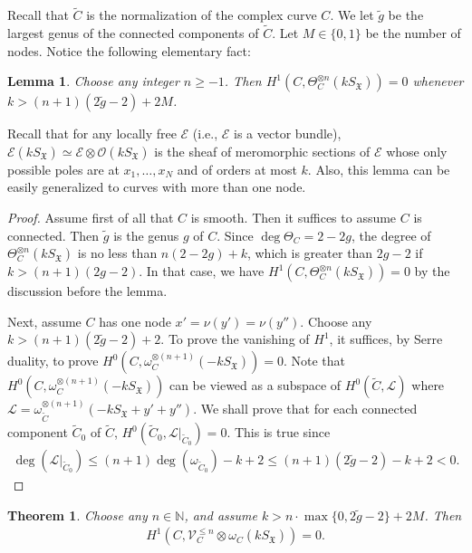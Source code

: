 \documentclass[11pt,b5paper,notitlepage]{article}
\theoremstyle{definition}
\theoremstyle{plain}
\newtheorem{thm}[df]{Theorem}
\newtheorem{lm}[df]{Lemma}
\newcommand{\fk}{\mathfrak}
\newcommand{\wtd}{\widetilde}
\newcommand{\scr}{\mathscr}
\newcommand{\SX}{S_{\fk X}}
\newcommand{\blt}{\bullet}
\newcommand{\Nbb}{\mathbb N}
\numberwithin{equation}{section}
\begin{document}
Recall that $\wtd C$ is the normalization of the complex curve $C$. We let $\wtd g$ be the largest genus of the connected components of $\wtd C$. Let $M\in\{0,1\}$ be the number of nodes. Notice the following elementary fact:

\begin{lm}\label{lb4}
Choose any integer $n\geq -1$. Then $H^1(C,\Theta_C^{\otimes n}(k\SX))=0$ whenever  $k>(n+1)(2\wtd g-2)+2M$.
\end{lm} 

Recall that for any locally free $\scr E$ (i.e., $\scr E$ is a vector bundle), \index{SX@$k\SX,\blt\SX$} $\scr E(k\SX)\simeq\scr E\otimes\scr O(k\SX)$ is the sheaf of meromorphic sections of $\scr E$ whose only possible poles are at $x_1,\dots,x_N$ and of orders at most $k$. Also, this lemma can be easily generalized to curves with more than one node.

\begin{proof}
Assume first of all that $C$ is smooth. Then it suffices to assume $C$ is connected. Then $\wtd g$ is the genus $g$ of $C$. Since $\deg\Theta_C=2-2g$, the degree of $\Theta_C^{\otimes n}(k\SX)$ is no less than $n(2-2g)+k$, which is greater than $2g-2$ if $k>(n+1)(2g-2)$. In that case, we have $H^1(C,\Theta_C^{\otimes n}(k\SX))=0$ by the discussion before the lemma.

Next, assume $C$ has one node $x'=\nu(y')=\nu(y'')$. Choose any $k>(n+1)(2\wtd g-2)+2$. To prove the vanishing of $H^1$, it suffices, by Serre duality, to prove $H^0(C,\omega_C^{\otimes(n+1)}(-k\SX))=0$. Note that $H^0(C,\omega_C^{\otimes(n+1)}(-k\SX))$ can be viewed as a subspace of $H^0(\wtd C,\scr L)$ where $\scr L=\omega_{\wtd C}^{\otimes(n+1)}(-k\SX+y'+y'')$. We shall prove that for each connected component $\wtd C_0$ of $\wtd C$, $H^0(\wtd C_0,\scr L|_{\wtd C_0})=0$. This is true since
\begin{align*}
\deg(\scr L|_{\wtd C_0})\leq (n+1)\deg(\omega_{\wtd C_0})-k+2\leq (n+1)(2\wtd g-2)-k+2<0.
\end{align*}
\end{proof}



\begin{thm}\label{lb9}
Choose any $n\in\Nbb$, and assume $k>n\cdot\max\{0,2\wtd g-2\}+2M$. Then
\begin{align*}
H^1(C,\scr V_C^{\leq n}\otimes\omega_C(k\SX))=0.
\end{align*}
\end{thm}
\end{document}
